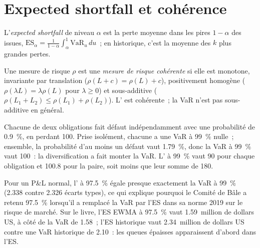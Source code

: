 \section{Expected shortfall et cohérence}

\begin{definition}\label{def:rc:market-risk-measures:es}
L'\emph{expected shortfall} de niveau $\alpha$ est la perte moyenne dans les pires $1-\alpha$ des
issues, $\mathrm{ES}_\alpha = \frac1{1-\alpha}\int_\alpha^1\mathrm{VaR}_u\,du$~; en historique, c'est la moyenne
des $k$ plus grandes pertes.
\end{definition}

\begin{definition}\label{def:rc:market-risk-measures:coherent}
Une mesure de risque $\rho$ est une \emph{mesure de risque cohérente} si elle est
monotone, invariante par translation ($\rho(L+c) = \rho(L)+c$), positivement homogène ($\rho(\lambda L) = \lambda\rho(L)$
pour $\lambda\ge0$) et sous-additive ($\rho(L_1+L_2)\le\rho(L_1)+\rho(L_2)$). L' est cohérente~;
la VaR n'est pas sous-additive en général.
\end{definition}

\begin{example}\label{ex:rc:market-risk-measures:subadd}
Chacune de deux obligations fait défaut indépendamment avec une probabilité de 0.9~\%, en perdant 100. Prise isolément, chacune
a une VaR à 99~\% nulle~; ensemble, la probabilité d'au moins un défaut vaut 1.79~\%, donc la VaR
à 99~\% vaut 100~: la diversification a fait monter la VaR. L' à 99~\% vaut 90 pour chaque obligation et 100.8 pour
la paire, soit moins que leur somme de 180.
\end{example}

Pour un P\&L normal, l' à 97.5~\% égale presque exactement la VaR à 99~\% (2.338 contre 2.326 écarts
types), ce qui explique pourquoi le Comité de Bâle a retenu 97.5~\% lorsqu'il a remplacé la VaR par l'ES dans sa
norme 2019 sur le risque de marché. Sur le livre, l'ES EWMA à 97.5~\% vaut 1.59~million de dollars US, à côté de la
VaR de 1.58~; l'ES historique vaut 2.34~million de dollars US contre une VaR historique de 2.10~: les queues épaisses apparaissent
d'abord dans l'ES.

